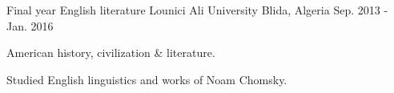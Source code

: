 

\begin{cventries}

  \cventry
    {Final year English literature} %
    {Lounici Ali University} %
    {Blida, Algeria} %
    {Sep. 2013 - Jan. 2016} %
    {
      \begin{cvitems} %
        \item {American history, civilization \& literature.}
        \item {Studied English linguistics and works of Noam Chomsky.}
      \end{cvitems}
    }

\end{cventries}
